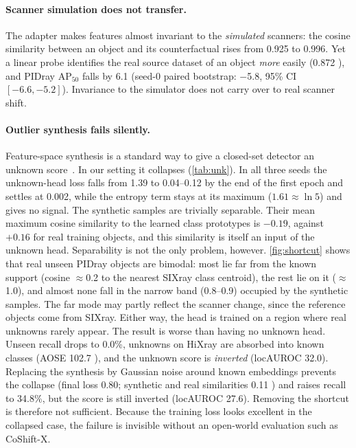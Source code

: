 \documentclass[10pt,twocolumn,letterpaper]{article}
\begin{document}
\paragraph{Scanner simulation does not transfer.} The adapter makes features almost invariant to the \emph{simulated} scanners: the cosine similarity between an object and its counterfactual rises from 0.925 to 0.996. Yet a linear probe identifies the real source dataset of an object \emph{more} easily (0.872 ), and PIDray AP$_{50}$ falls by 6.1 (seed-0 paired bootstrap: $-$5.8, 95\% CI $[-6.6,-5.2]$). Invariance to the simulator does not carry over to real scanner shift.

\paragraph{Outlier synthesis fails silently.} Feature-space synthesis is a standard way to give a closed-set detector an unknown score~\cite{du2022vos}. In our setting it collapses (\cref{tab:unk}). In all three seeds the unknown-head loss falls from 1.39 to 0.04--0.12 by the end of the first epoch and settles at 0.002, while the entropy term stays at its maximum ($1.61\approx\ln 5$) and gives no signal. The synthetic samples are trivially separable. Their mean maximum cosine similarity to the learned class prototypes is $-0.19$, against $+0.16$ for real training objects, and this similarity is itself an input of the unknown head. Separability is not the only problem, however. \cref{fig:shortcut} shows that real unseen PIDray objects are bimodal: most lie far from the known support (cosine $\approx$0.2 to the nearest SIXray class centroid), the rest lie on it ($\approx$1.0), and almost none fall in the narrow band (0.8--0.9) occupied by the synthetic samples. The far mode may partly reflect the scanner change, since the reference objects come from SIXray. Either way, the head is trained on a region where real unknowns rarely appear. The result is worse than having no unknown head. Unseen recall drops to 0.0\%, unknowns on HiXray are absorbed into known classes (AOSE 102.7 ), and the unknown score is \emph{inverted} (locAUROC 32.0). Replacing the synthesis by Gaussian noise around known embeddings prevents the collapse (final loss 0.80; synthetic and real similarities 0.11 ) and raises recall to 34.8\%, but the score is still inverted (locAUROC 27.6). Removing the shortcut is therefore not sufficient. Because the training loss looks excellent in the collapsed case, the failure is invisible without an open-world evaluation such as CoShift-X.
\end{document}
